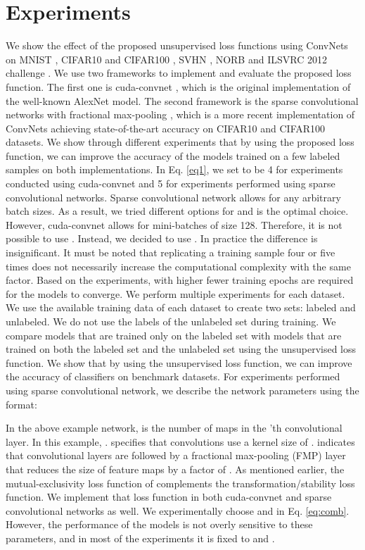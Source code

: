 \documentclass{article}
\begin{document}
\section{Experiments}
We show the effect of the proposed unsupervised loss functions using ConvNets on MNIST \cite{lecun1998gradient}, CIFAR10 and CIFAR100 \cite{krizhevsky2009learning}, SVHN \cite{netzer2011reading}, NORB \cite{lecun2004learning} and ILSVRC 2012 challenge \cite{berg2010large}. We use two frameworks to implement and evaluate the proposed loss function. The first one is cuda-convnet \cite{cudac}, which is the original implementation of the well-known AlexNet model. The second framework is the sparse convolutional networks \cite{graham2014spatially} with fractional max-pooling \cite{graham2014fractional}, which is a more recent implementation of ConvNets achieving state-of-the-art accuracy on CIFAR10 and CIFAR100 datasets. We show through different experiments that by using the proposed loss function, we can improve the accuracy of the models trained on a few labeled samples on both implementations. In Eq. \ref{eq1}, we set  to be 4 for experiments conducted using cuda-convnet and 5 for experiments performed using sparse convolutional networks. Sparse convolutional network allows for any arbitrary batch sizes. As a result, we tried different options for  and  is the optimal choice. However, cuda-convnet allows for mini-batches of size 128. Therefore, it is not possible to use . Instead, we decided to use . In practice the difference is insignificant. It must be noted that replicating a training sample four or five times does not necessarily  increase the computational complexity with the same factor. Based on the experiments, with higher  fewer training epochs are required for the models to converge. We perform multiple experiments for each dataset. We use the available training data of each dataset to create two sets: labeled and unlabeled. We do not use the labels of the unlabeled set during training. We compare models that are trained only on the labeled set with models that are trained on both the labeled set and the unlabeled set using the unsupervised loss function. We show that by using the unsupervised loss function, we can improve the accuracy of classifiers on benchmark datasets. For experiments performed using sparse convolutional network, we describe the network parameters using the format:

In the above example network,  is the number of maps in the 'th convolutional layer. In this example, .  specifies that convolutions use a kernel size of .  indicates that convolutional layers are followed by a fractional max-pooling (FMP) layer \cite{graham2014fractional} that reduces the size of feature maps by a factor of . As mentioned earlier, the mutual-exclusivity loss function of \cite{mutualexclusive} complements the transformation/stability loss function. We implement that loss function in both cuda-convnet and sparse convolutional networks as well. We experimentally choose  and  in Eq. \ref{eq:comb}. However, the performance of the models is not overly sensitive to these parameters, and in most of the experiments it is fixed to  and .
\vspace{-0.2cm}
\end{document}
